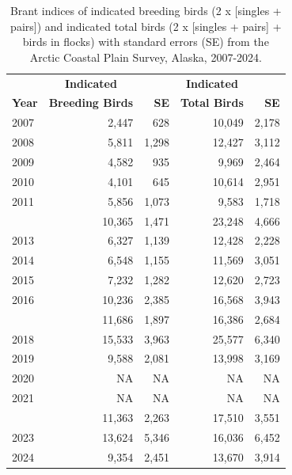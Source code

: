 \documentclass[
]{article}
\begin{document}
\begingroup\fontsize{10}{12}\selectfont

\begin{longtable}[t]{lrrrr}

\caption{\label{tbl-BRAN}Brant indices of indicated breeding birds (2 x
{[}singles + pairs{]}) and indicated total birds (2 x {[}singles +
pairs{]} + birds in flocks) with standard errors (SE) from the Arctic
Coastal Plain Survey, Alaska, 2007-2024.}

\tabularnewline

\\
\toprule
\multicolumn{1}{c}{\textbf{ }} & \multicolumn{1}{c}{\textbf{Indicated}} & \multicolumn{1}{c}{\textbf{ }} & \multicolumn{1}{c}{\textbf{Indicated}} & \multicolumn{1}{c}{\textbf{ }} \\
\cmidrule(l{3pt}r{3pt}){2-2} \cmidrule(l{3pt}r{3pt}){4-4}
\textbf{Year} & \textbf{Breeding Birds} & \textbf{SE} & \textbf{Total Birds} & \textbf{SE}\\
\midrule
2007 & 2,447 & 628 & 10,049 & 2,178\\
2008 & 5,811 & 1,298 & 12,427 & 3,112\\
2009 & 4,582 & 935 & 9,969 & 2,464\\
2010 & 4,101 & 645 & 10,614 & 2,951\\
2011 & 5,856 & 1,073 & 9,583 & 1,718\\
\addlinespace
2012 & 10,365 & 1,471 & 23,248 & 4,666\\
2013 & 6,327 & 1,139 & 12,428 & 2,228\\
2014 & 6,548 & 1,155 & 11,569 & 3,051\\
2015 & 7,232 & 1,282 & 12,620 & 2,723\\
2016 & 10,236 & 2,385 & 16,568 & 3,943\\
\addlinespace
2017 & 11,686 & 1,897 & 16,386 & 2,684\\
2018 & 15,533 & 3,963 & 25,577 & 6,340\\
2019 & 9,588 & 2,081 & 13,998 & 3,169\\
2020 & NA & NA & NA & NA\\
2021 & NA & NA & NA & NA\\
\addlinespace
2022 & 11,363 & 2,263 & 17,510 & 3,551\\
2023 & 13,624 & 5,346 & 16,036 & 6,452\\
2024 & 9,354 & 2,451 & 13,670 & 3,914\\
\bottomrule

\end{longtable}
\end{document}

